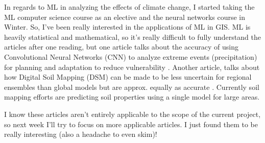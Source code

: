 \documentclass[a4paper,10pt]{article}
\begin{document}
In regards to ML in analyzing the effects of climate change, I started taking the ML computer science course as an elective and the neural networks course in Winter. So, I've been really interested in the applications of ML in GIS. ML is heavily statistical and mathematical, so it's really difficult to fully understand the articles after one reading, but one article talks about the accuracy of using Convolutional Neural Networks (CNN) to analyze extreme events (precipitation) for planning and adaptation to reduce vulnerability \cite{davenport2021using}. Another article, talks about how Digital Soil Mapping (DSM) can be made to be less uncertain for regional ensembles than global models but are approx. equally as accurate \cite{brungard2021regional}. Currently soil mapping efforts are predicting soil properties using a single model for large areas. 

I know these articles aren't entirely applicable to the scope of the current project, so next week I'll try to focus on more applicable articles. I just found them to be really interesting (also a headache to even skim)!



\end{document}
